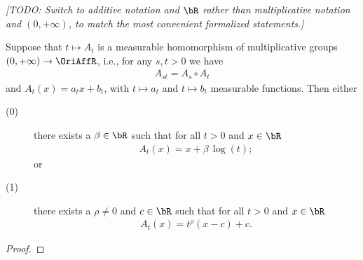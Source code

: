 \begin{theorem}
  \label{thm:one-parameter-subgroups-of-affine-isomorphisms}
  \leanok
  \emph{[TODO: Switch to additive notation and $\bR$ rather than multiplicative
  notation and $(0,+\infty)$, to match the most convenient formalized statements.]}

  Suppose that $t \mapsto A_t$ is a measurable homomorphism of multiplicative groups
  $(0,+\infty) \to \OriAffR$, i.e., for any $s, t > 0$ we have
  \begin{align*}
    A_{s t} = A_s \circ A_t
  \end{align*}
  and $A_t(x) = a_t x + b_t$, with $t \mapsto a_t$ and $t \mapsto b_t$
  measurable functions.
  Then either
  \begin{description}
    \item[(0)] there exists a $\beta \in \bR$ such that for all $t > 0$ and $x \in \bR$
      \begin{align*}
        A_t(x) = x + \beta \, \log(t) ;
      \end{align*}
      or
    \item[(1)] there exists a $\rho \ne 0$ and $c \in \bR$ such that
      for all $t > 0$ and $x \in \bR$
      \begin{align*}
        A_t(x) = t^{\rho} (x - c) + c .
      \end{align*}
  \end{description}
\end{theorem}
\begin{proof}
\end{proof}
